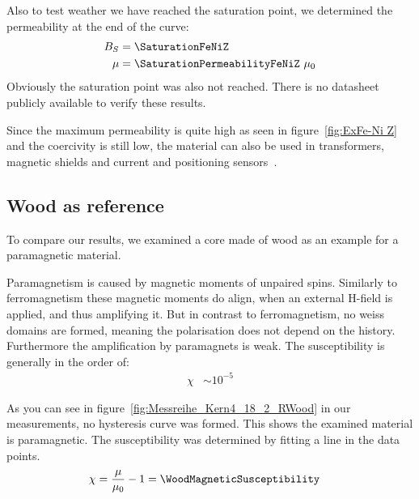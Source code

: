 \documentclass[a4paper,10pt,twocolumn]{article}
\begin{document}
    Also to test weather we have reached the saturation point, we determined the permeability at the end of the curve:
    \begin{align*}
        B_S &= \SaturationFeNiZ \\
        \mu &= \SaturationPermeabilityFeNiZ \ \mu_0
    \end{align*}
    Obviously the saturation point was also not reached.
    There is no datasheet publicly available to verify these results.
    
    Since the maximum permeability is quite high as seen in figure~\ref{fig:ExFe-Ni Z} and the coercivity is still
    low, the material can also be used in transformers, magnetic shields and current and positioning sensors~\cite{feniDatasheet}.
    
    \subsection{Wood as reference}
    
    
    To compare our results, we examined a core made of wood as an example for a paramagnetic material.
    
    Paramagnetism is caused by magnetic moments of unpaired spins\cite{gerth}.
    Similarly to ferromagnetism these magnetic moments do align, when an external H-field is applied,
    and thus amplifying it.
    But in contrast to ferromagnetism, no weiss domains are formed, meaning the polarisation does not depend
    on the history.
    Furthermore the amplification by paramagnets is weak.
    The susceptibility is generally in the order of:
    \begin{align*}
        \chi  &\sim 10^{-5}
    \end{align*}
    
    As you can see in figure~\ref{fig:Messreihe_Kern4_18_2_RWood} in our measurements, no hysteresis curve was formed.
    This shows the examined material is paramagnetic.
    The susceptibility was determined by fitting a line in the data points.
    \begin{align*}
        \chi &= \frac{\mu}{\mu_0} - 1 = \WoodMagneticSusceptibility
    \end{align*}
    
\end{document}
